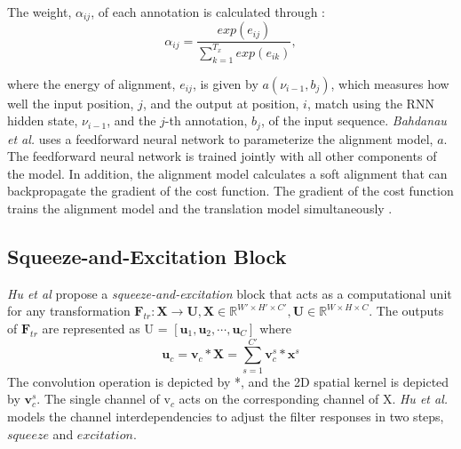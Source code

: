 \documentclass[preprint,12pt,3p]{elsarticle}
\begin{document}
The weight, $\alpha_{ij}$, of each annotation is calculated through : 
\begin{equation}
    \alpha_{ij} = \frac{exp(e_{ij})}{\sum_{k=1}^{T_x} exp(e_{ik})},
\end{equation}

where the energy of alignment, $e_{ij}$, is given by $a(\nu_{i-1}, b_j)$, which measures how well the input position, $j$, and the output at position, $i$, match using the RNN hidden state, $\nu_{i-1}$, and the $j$-th annotation, $b_j$, of the input sequence. \textit{Bahdanau et al.}\cite{bahdanau2014neural} uses a feedforward neural network to parameterize the alignment model, $a$. The feedforward neural network is trained jointly with all other components of the model. In addition, the alignment model calculates a soft alignment that can backpropagate the gradient of the cost function. The gradient of the cost function trains the alignment model and the translation model simultaneously \cite{bahdanau2014neural}. 


\subsection{Squeeze-and-Excitation Block}
\textit{Hu  et al} \cite{hu2017squeeze} propose a  \textit{squeeze-and-excitation} block that acts as a computational unit for any transformation $\textbf{F}_{tr} : \textbf{X} \rightarrow \textbf{U}, \textbf{X} \in \mathbb{R}^{W' \times H' \times C'}, \textbf{U} \in \mathbb{R}^{W \times H \times C}$. The outputs of $\textbf{F}_{tr}$ are represented as U = $[\textbf{u}_1, \textbf{u}_2, \cdots, \textbf{u}_C]$ where 
\begin{equation}
    \textbf{u}_c = \textbf{v}_c * \textbf{X} = \sum_{s=1}^{C'}{\textbf{v}_c^s*\textbf{x}^s}
\end{equation}
The convolution operation is depicted by *, and the 2D spatial kernel is depicted by $\mathbf v_c^s$. The single channel of v$_c$ acts on the corresponding channel of X. \textit{Hu  et al.} \cite{hu2017squeeze} models the channel interdependencies to adjust the filter responses in two steps, $squeeze$ and $excitation$. 
\end{document}
